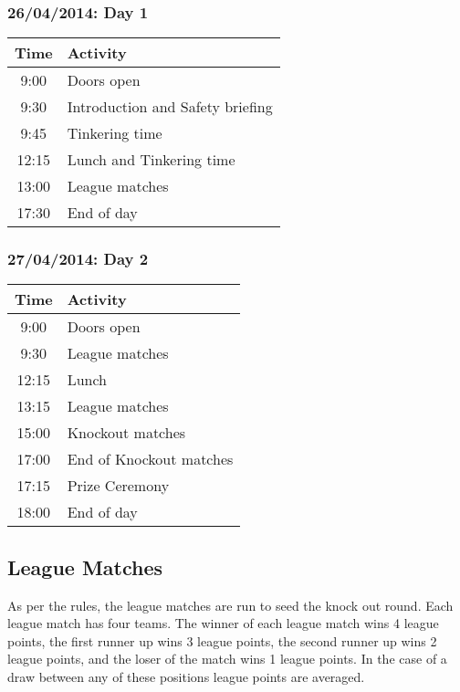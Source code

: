 \documentclass[12pt]{article}
\begin{document}
\begin{center}
    \subsubsection{26/04/2014: Day 1}

    \begin{tabular}{|c|l|}
        \hline
        Time & Activity \\ \hline
        9:00 & Doors open \\ \hline
        9:30 & Introduction and Safety briefing \\ \hline
        9:45 & Tinkering time \\ \hline
        12:15 & Lunch and Tinkering time \\ \hline
        13:00 & League matches \\ \hline
        17:30 & End of day \\ \hline
    \end{tabular}

    \subsubsection{27/04/2014: Day 2}

    \begin{tabular}{|c|l|}
        \hline
        Time & Activity \\ \hline
        9:00 & Doors open \\ \hline
        9:30 & League matches \\ \hline
        12:15 & Lunch \\ \hline
        13:15 & League matches \\ \hline
        15:00 & Knockout matches \\ \hline
        17:00 & End of Knockout matches \\ \hline
        17:15 & Prize Ceremony \\ \hline
        18:00 & End of day \\ \hline
    \end{tabular}
\end{center}

\subsection{League Matches}

As per the rules, the league matches are run to seed the knock out
round. Each league match has four teams. The winner of each league match
wins 4 league points, the first runner up wins 3 league points, the
second runner up wins 2 league points, and the loser of the match wins 1
league points. In the case of a draw between any of these positions
league points are averaged.
\end{document}
